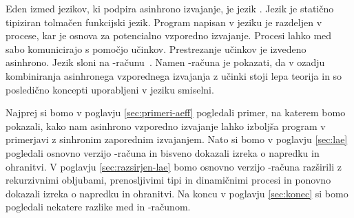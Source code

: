 %



Eden izmed jezikov, ki podpira asinhrono izvajanje, je jezik \aeff{}. Jezik \aeff{} je statično tipiziran tolmačen funkcijski jezik. Program napisan v jeziku \aeff{} je razdeljen v procese, kar je osnova za potencialno vzporedno izvajanje. Procesi lahko med sabo komunicirajo s pomočjo učinkov. Prestrezanje učinkov je izvedeno asinhrono.
Jezik \aeff{} sloni na \lae{}-računu~\cite{aeff}. Namen \lae{}-računa je pokazati, da v ozadju kombiniranja asinhronega vzporednega izvajanja z učinki stoji lepa teorija in so posledično koncepti uporabljeni v jeziku \aeff{} smiselni.


Najprej si bomo v poglavju \ref{sec:primeri-aeff} pogledali primer, na katerem bomo pokazali, kako nam asinhrono vzporedno izvajanje lahko izboljša program v primerjavi z sinhronim zaporednim izvajanjem.
Nato si bomo v poglavju \ref{sec:lae} pogledali osnovno verzijo \lae{}-računa in bisveno dokazali izreka o napredku in ohranitvi. V poglavju \ref{sec:razsirjen-lae} bomo osnovno verzijo \lae{}-računa razširili z rekurzivnimi obljubami, prenosljivimi tipi in dinamičnimi procesi in ponovno dokazali izreka o napredku in ohranitvi. Na koncu v poglavju \ref{sec:konec} si bomo pogledali nekatere razlike med \aeff{} in \lae{}-računom.